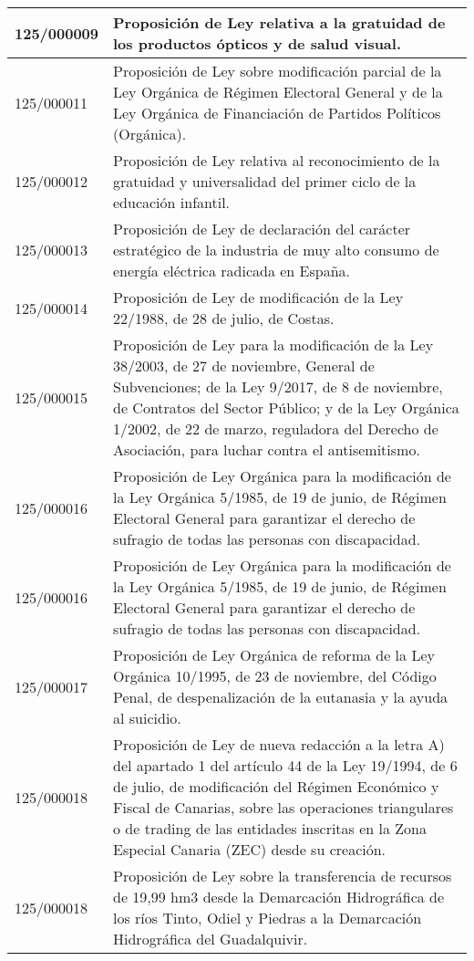 {\begin{table}[H]
\begin{center}
\begin{tabularx}{\linewidth}{| l | X |}
\hline
125/000009 & Proposición de Ley relativa a la gratuidad de los productos ópticos y de salud visual. \\
\hline
125/000011 & Proposición de Ley sobre modificación parcial de la Ley Orgánica de Régimen Electoral General y de la Ley Orgánica de Financiación de Partidos Políticos (Orgánica). \\
\hline
125/000012 & Proposición de Ley relativa al reconocimiento de la gratuidad y universalidad del primer ciclo de la educación infantil. \\
\hline
125/000013 & Proposición de Ley de declaración del carácter estratégico de la industria de muy alto consumo de energía eléctrica radicada en España. \\
\hline
125/000014 & Proposición de Ley de modificación de la Ley 22/1988, de 28 de julio, de Costas. \\
\hline
125/000015 & Proposición de Ley para la modificación de la Ley 38/2003, de 27 de noviembre, General de Subvenciones; de la Ley 9/2017, de 8 de noviembre, de Contratos del Sector Público; y de la Ley Orgánica 1/2002, de 22 de marzo, reguladora del Derecho de Asociación, para luchar contra el antisemitismo. \\
\hline
125/000016 & Proposición de Ley Orgánica para la modificación de la Ley Orgánica 5/1985, de 19 de junio, de Régimen Electoral General para garantizar el derecho de sufragio de todas las personas con discapacidad. \\
\hline
125/000016 & Proposición de Ley Orgánica para la modificación de la Ley Orgánica 5/1985, de 19 de junio, de Régimen Electoral General para garantizar el derecho de sufragio de todas las personas con discapacidad. \\
\hline
125/000017 & Proposición de Ley Orgánica de reforma de la Ley Orgánica 10/1995, de 23 de noviembre, del Código Penal, de despenalización de la eutanasia y la ayuda al suicidio. \\
\hline
125/000018 & Proposición de Ley de nueva redacción a la letra A) del apartado 1 del artículo 44 de la Ley 19/1994, de 6 de julio, de modificación del Régimen Económico y Fiscal de Canarias, sobre las operaciones triangulares o de trading de las entidades inscritas en la Zona Especial Canaria (ZEC) desde su creación. \\
\hline
125/000018 & Proposición de Ley sobre la transferencia de recursos de 19,99 hm3 desde la Demarcación Hidrográfica de los ríos Tinto, Odiel y Piedras a la Demarcación Hidrográfica del Guadalquivir. \\

\end{tabularx}
\end{center}
\end{table}}
